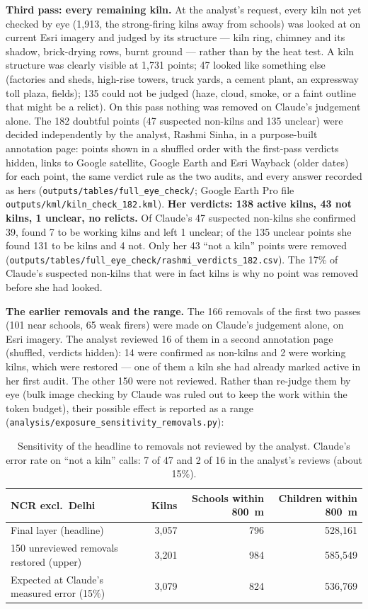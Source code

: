 \documentclass[11pt,a4paper]{article}
\begin{document}
\textbf{Third pass: every remaining kiln.} At the analyst's request,
every kiln not yet checked by eye (1{,}913, the strong-firing kilns away from
schools) was looked at on current Esri imagery and judged by its structure ---
kiln ring, chimney and its shadow, brick-drying rows, burnt ground --- rather than
by the heat test. A kiln structure was clearly visible at 1{,}731 points; 47
looked like something else (factories and sheds, high-rise towers, truck yards,
a cement plant, an expressway toll plaza, fields); 135 could not be judged (haze,
cloud, smoke, or a faint outline that might be a relict).
On this pass nothing was removed on Claude's judgement alone. The 182 doubtful points (47
suspected non-kilns and 135 unclear) were decided independently by the analyst,
Rashmi Sinha, in a purpose-built annotation page: points shown in a
shuffled order with the first-pass verdicts hidden, links to Google satellite,
Google Earth and Esri Wayback (older dates) for each point, the same verdict rule
as the two audits, and every answer recorded as hers
(\texttt{outputs/tables/full\_eye\_check/}; Google Earth Pro file
\texttt{outputs/kml/kiln\_check\_182.kml}). \textbf{Her verdicts: 138 active
kilns, 43 not kilns, 1 unclear, no relicts.} Of Claude's 47 suspected non-kilns
she confirmed 39, found 7 to be working kilns and left 1 unclear; of the 135
unclear points she found 131 to be kilns and 4 not. Only her 43 ``not a kiln''
points were removed (\texttt{outputs/tables/full\_eye\_check/rashmi\_verdicts\_182.csv}).
The 17\% of Claude's suspected non-kilns that were in fact kilns is why no point
was removed before she had looked.

\textbf{The earlier removals and the range.} The 166 removals of the first two
passes (101 near schools, 65 weak firers) were made on Claude's judgement alone,
on Esri imagery. The analyst reviewed 16 of them in a second annotation page
(shuffled, verdicts hidden): 14 were confirmed as non-kilns and 2 were working
kilns, which were restored --- one of them a kiln she had already marked active in
her first audit. The other 150 were not reviewed. Rather than re-judge them by eye
(bulk image checking by Claude was ruled out to keep the work within the token
budget), their possible effect is reported as a range
(\texttt{analysis/exposure\_sensitivity\_removals.py}):

\begin{table}[H]
\centering\small
\begin{tabular}{@{}lrrr@{}}
\toprule
NCR excl.\ Delhi & Kilns & Schools within 800~m & Children within 800~m \\
\midrule
Final layer (headline)                     & 3{,}057 & 796     & 528{,}161 \\
150 unreviewed removals restored (upper)   & 3{,}201 & 984     & 585{,}549 \\
Expected at Claude's measured error (15\%) & 3{,}079 & 824     & 536{,}769 \\
\bottomrule
\end{tabular}
\caption{Sensitivity of the headline to removals not reviewed by the analyst.
Claude's error rate on ``not a kiln'' calls: 7 of 47 and 2 of 16 in the analyst's
reviews (about 15\%).}
\end{table}
\end{document}
